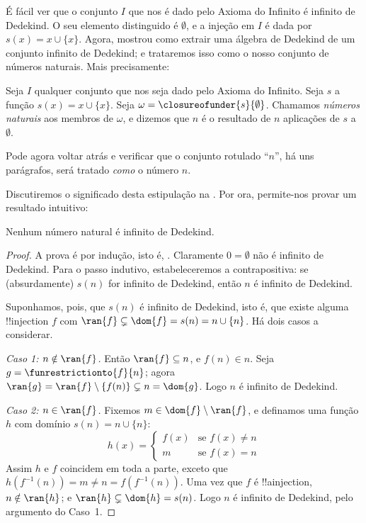 \documentclass[../../../include/open-logic-section]{subfiles}
\begin{document}
É fácil ver que o conjunto $I$ que nos é dado pelo Axioma do
Infinito é infinito de Dedekind. O seu elemento distinguido é
$\emptyset$, e a injeção em $I$ é dada por $s(x) = x\cup
\{x\}$. Agora,
 mostrou
como extrair uma álgebra de Dedekind de um conjunto infinito de Dedekind; e
trataremos isso como o nosso conjunto de números naturais. Mais precisamente:
\begin{defn}
Seja $I$ qualquer conjunto que nos seja dado pelo Axioma do Infinito. Seja $s$
a função $s(x) = x \cup \{x\}$. Seja $\omega =
\closureofunder{s}{\emptyset}$. Chamamos \emph{números naturais} aos membros de $\omega$,
e dizemos que $n$ é o resultado de $n$ aplicações de $s$ a $\emptyset$.
\end{defn}

Pode agora voltar atrás e verificar que o conjunto rotulado ``$n$'', há uns
parágrafos, será tratado \emph{como} o número $n$. 

Discutiremos o significado desta estipulação na
. Por ora, permite-nos provar um
resultado intuitivo:

\begin{prop}
Nenhum número natural é infinito de Dedekind.
\end{prop}

\begin{proof}
A prova é por indução, isto é,
. Claramente $0
= \emptyset$ não é infinito de Dedekind. Para o passo indutivo, estabeleceremos a contrapositiva: se (absurdamente) $s(n)$ for infinito de
Dedekind, então $n$ é infinito de Dedekind. 

Suponhamos, pois, que $s(n)$ é infinito de Dedekind, isto é, que existe alguma
!!{injection} $f$ com $\ran{f}\subsetneq \dom{f} = s(n) = n \cup
\{n\}$. Há dois casos a considerar. 

\emph{Caso 1: $n \notin \ran{f}$.} Então $\ran{f} \subseteq n$, e $f(n) \in n$. Seja $g = \funrestrictionto{f}{n}$; agora $\ran{g} =
\ran{f} \setminus \{f(n)\} \subsetneq n = \dom{g}$. Logo $n$ é
infinito de Dedekind. 

\emph{Caso 2: $n \in \ran{f}$.} Fixemos $m \in \dom{f} \setminus \ran{f}$, e definamos uma função $h$ com domínio $s(n) = n \cup \{n\}$:
\[
h(x) = 
	\begin{cases}
		f(x) & \text{se }f(x) \neq n\\
		m & \text{se }f(x)=n
	\end{cases}
\]
Assim $h$ e $f$ coincidem em toda a parte, exceto que $h(f^{-1}(n)) = m
\neq n = f(f^{-1}(n))$. Uma vez que $f$ é !!a{injection}, $n \notin
\ran{h}$; e $\ran{h} \subsetneq \dom{h} = s(n)$. Logo $n$ é
infinito de Dedekind, pelo argumento do Caso~1.
\end{proof}
\end{document}
